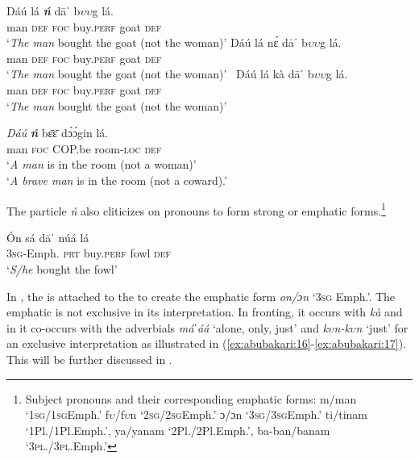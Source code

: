 \documentclass[output=paper
,newtxmath
,modfonts
,nonflat]{langsci/langscibook}
\begin{document}
 
 
\ea\label{ex:abubakari:13}
\ea\label{ex:abubakari:13a}  
\gll Dáú    lá \textbf{\textit{ń}} dāˈ    b$\upsilon \upsilon $g  lá.\\
man  \textsc{def}  \textsc{foc}  buy.\textsc{perf}  goat  \textsc{def}\\
\glt ‘\textit{The man} bought the goat (not the woman)’
\ex\label{ex:abubakari:13b}
\gll *Dáú  lá  nɛ́  dāˈ    b$\upsilon \upsilon $g  lá.\\
man  \textsc{def}  \textsc{foc}  buy.\textsc{perf}  goat  \textsc{def} \\
\glt ‘\textit{The man} bought the goat (not the woman)’
\ex\label{ex:abubakari:13c}\
\gll *Dáú  lá  kà  dāˈ    b$\upsilon \upsilon $g  lá.\\
man  \textsc{def}  \textsc{foc}  buy.\textsc{perf}  goat  \textsc{def}\\
\glt ‘\textit{The man} bought the goat (not the woman)’
\z 
\z
 
\ea\label{ex:abubakari:14} 
\gll \textit{Dáú} \textbf{\textit{ń}} bɛ̄ɛ̄    dɔ́ɔ́gin    lá.\\
man  \textsc{foc}  COP.be    room-\textsc{loc}  \textsc{def}\\
\glt ‘\textit{A man} is in the room (not a woman)’\\
\glt ‘\textit{A brave man} is in the room (not a coward).’
\z 

The particle \textit{ń} also cliticizes on  pronouns to form strong or emphatic forms.\footnote{Subject pronouns and their corresponding emphatic forms: m/man ‘1\textsc{sg}/1\textsc{sg}Emph.’ f$\upsilon $/f$\upsilon $n ‘2\textsc{sg}/2\textsc{sg}Emph.’ ɔ/ɔn ‘3\textsc{sg}/3\textsc{sg}Emph.’ ti/tinam ‘1Pl./1Pl.Emph.’, ya/yanam ‘2Pl./2Pl.Emph.’, ba-ban/banam ‘3\textsc{pl}./3\textsc{pl}.Emph.’}

 
\ea\label{ex:abubakari:15}  
\gll \'{O}n    sá  dāˈ    núá  lá\\
3\textsc{sg}-Emph.  \textsc{prt}  buy.\textsc{perf}  fowl  \textsc{def}\\
\glt ‘\textit{S/he} bought the fowl’    
\z 

In , the  is attached to the  to create the emphatic form \textit{on/ɔn} ‘3\textsc{sg} Emph.’. The emphatic  is not exclusive in its interpretation. In fronting, it occurs with \textit{kà} and in  it co-occurs with the adverbials \textit{máˈáá} ‘alone, only, just’ and \textit{k$\upsilon $n-k$\upsilon $n} ‘just’ for an exclusive interpretation as illustrated in (\ref{ex:abubakari:16}-\ref{ex:abubakari:17}). This will be further discussed in .
\end{document}
